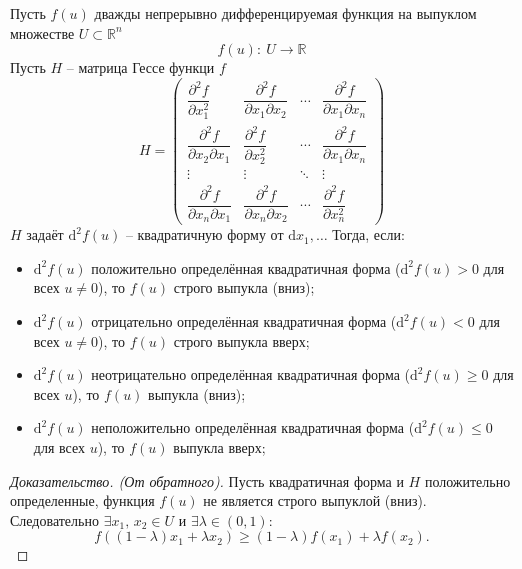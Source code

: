 
\begin{theorem}
	Пусть $f(u)$ дважды непрерывно дифференцируемая функция на выпуклом множестве $U\subset\mathbb{R}^n$
	\begin{equation*}
		f(u):\: U \to \mathbb{R}
	\end{equation*}
	Пусть $H$ -- матрица Гессе функци $f$
	\begin{equation*}
		H = 
		\begin{pmatrix}
		\dfrac{\partial^2f}{\partial x_1^2} & \dfrac{\partial^2f}{\partial x_1\partial x_2}& \cdots & \dfrac{\partial^2f}{\partial x_1 \partial x_n}\\[12pt]
		\dfrac{\partial^2f}{\partial x_2\partial x_1} & \dfrac{\partial^2f}{\partial x_2^2}& \cdots & \dfrac{\partial^2f}{\partial x_1 \partial x_n}\\[12pt]
		\vdots & \vdots & \ddots & \vdots\\[8pt]
		\dfrac{\partial^2f}{\partial x_n\partial x_1} & \dfrac{\partial^2f}{\partial x_n\partial x_2}& \cdots & \dfrac{\partial^2f}{\partial x_n^2}
		\end{pmatrix}
	\end{equation*}
	$H$ задаёт $\mathrm{d}^2f(u)$ -- квадратичную форму от $\mathrm{d}x_1,\dots$
	Тогда, если:
	\begin{itemize}
		\item $\mathrm{d}^2f(u)$ положительно определённая квадратичная форма ($\mathrm{d}^2f(u)>0$ для всех $u\neq0$), то
		$f(u)$ строго выпукла (вниз);
		\item $\mathrm{d}^2f(u)$ отрицательно определённая квадратичная форма ($\mathrm{d}^2f(u)<0$ для всех $u\neq0$), то
		$f(u)$ строго выпукла вверх;
		\item $\mathrm{d}^2f(u)$ неотрицательно определённая квадратичная форма ($\mathrm{d}^2f(u)\geq0$ для всех $u$), то
		$f(u)$ выпукла (вниз);
		\item $\mathrm{d}^2f(u)$ неположительно определённая квадратичная форма ($\mathrm{d}^2f(u)\leq0$ для всех $u$), то
		$f(u)$ выпукла вверх;
	\end{itemize}
	\begin{proof}[Доказательство. (От обратного)]
		Пусть квадратичная форма и $H$ положительно определенные, функция $f(u)$ не является строго выпуклой (вниз). Следовательно $\exists x_1,\, x_2 \in U$ и $\exists \lambda\in(0,1)$:
		\begin{equation}\label{доказательство гессе}
			f((1-\lambda)x_1+\lambda x_2)\geq (1-\lambda)f(x_1) + \lambda f(x_2).
		\end{equation}
		

\end{proof}
\end{theorem}
